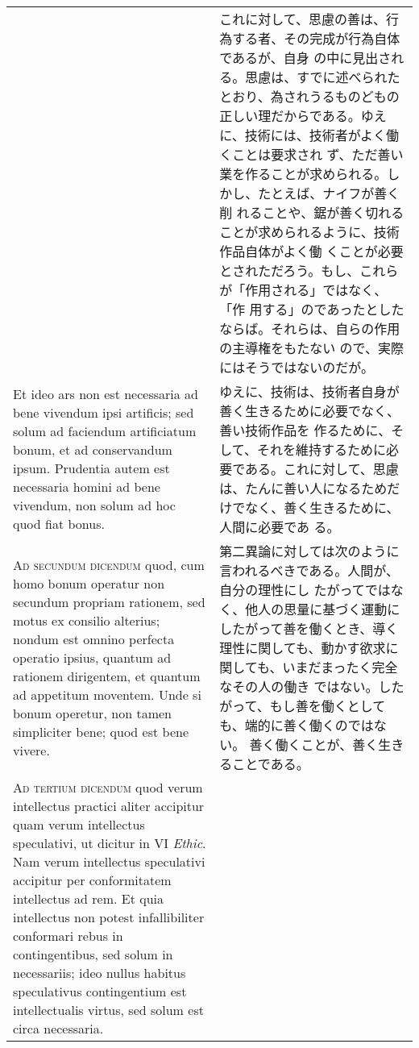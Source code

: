 \documentclass[10pt]{jsarticle}
\begin{document}
\begin{longtable}{p{21em}p{21em}}
&

これに対して、思慮の善は、行為する者、その完成が行為自体であるが、自身
の中に見出される。思慮は、すでに述べられたとおり、為されうるものどもの
正しい理だからである。ゆえに、技術には、技術者がよく働くことは要求され
ず、ただ善い業を作ることが求められる。しかし、たとえば、ナイフが善く削
れることや、鋸が善く切れることが求められるように、技術作品自体がよく働
くことが必要とされただろう。もし、これらが「作用される」ではなく、「作
用する」のであったとしたならば。それらは、自らの作用の主導権をもたない
ので、実際にはそうではないのだが。

\\

Et ideo ars non est necessaria ad bene vivendum ipsi artificis; sed
solum ad faciendum artificiatum bonum, et ad conservandum ipsum.
Prudentia autem est necessaria homini ad bene vivendum, non solum ad
hoc quod fiat bonus.

&

ゆえに、技術は、技術者自身が善く生きるために必要でなく、善い技術作品を
作るために、そして、それを維持するために必要である。これに対して、思慮
は、たんに善い人になるためだけでなく、善く生きるために、人間に必要であ
る。

\\

{\scshape Ad secundum dicendum} quod, cum homo bonum operatur non
secundum propriam rationem, sed motus ex consilio alterius; nondum est
omnino perfecta operatio ipsius, quantum ad rationem dirigentem, et
quantum ad appetitum moventem. Unde si bonum operetur, non tamen
simpliciter bene; quod est bene vivere.

&

第二異論に対しては次のように言われるべきである。人間が、自分の理性にし
たがってではなく、他人の思量に基づく運動にしたがって善を働くとき、導く
理性に関しても、動かす欲求に関しても、いまだまったく完全なその人の働き
ではない。したがって、もし善を働くとしても、端的に善く働くのではない。
善く働くことが、善く生きることである。

\\

{\scshape Ad tertium dicendum} quod verum intellectus practici aliter
accipitur quam verum intellectus speculativi, ut dicitur in VI
{\itshape Ethic}. Nam verum intellectus speculativi accipitur per
conformitatem intellectus ad rem. Et quia intellectus non potest
infallibiliter conformari rebus in contingentibus, sed solum in
necessariis; ideo nullus habitus speculativus contingentium est
intellectualis virtus, sed solum est circa necessaria.


\end{longtable}
\end{document}
